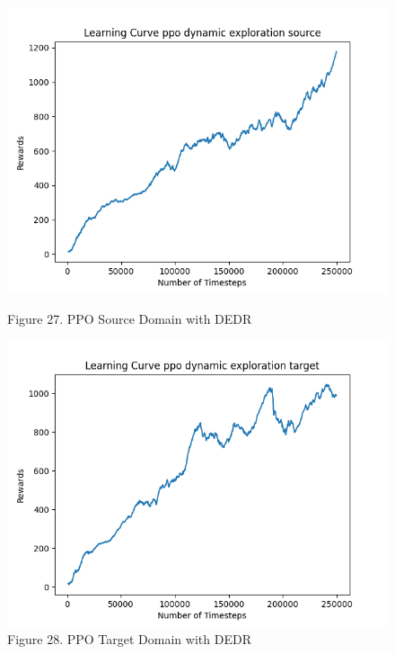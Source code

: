 \documentclass[12pt]{article}
\begin{document}
\begin{figure}[H]
    \vfill
    \begin{minipage}{0.45\textwidth}
        \centering
        \includegraphics[width=\textwidth]{../images/Learning_Curve_PPO_DE_Source.png}
        \caption{Figure 27. PPO Source Domain with DEDR}
        \label{fig:ppo_source_dedr}
    \end{minipage}
    \hfill
    \begin{minipage}{0.45\textwidth}
        \centering
        \includegraphics[width=\textwidth]{../images/Learning_Curve_PPO_DE_Target.png}
        \caption{Figure 28. PPO Target Domain with DEDR}
        \label{fig:ppo_target_dedr}
    \end{minipage}
\end{figure}
\end{document}
